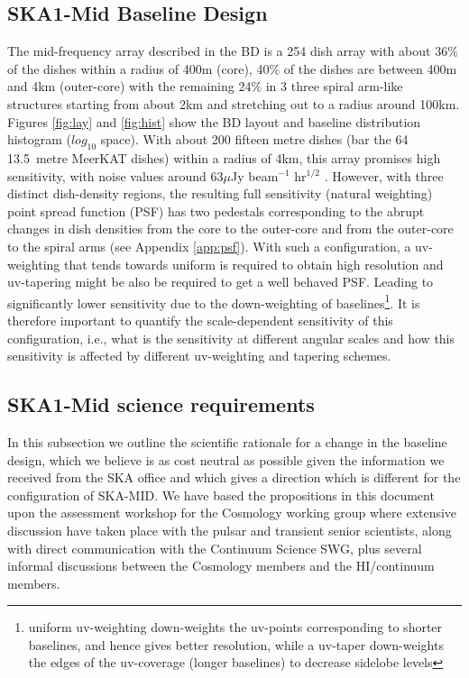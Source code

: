 \documentclass[sfheadings,a4paper,times,9pt,floats,floatfix]{article}
\begin{document}
\subsection{SKA1-Mid Baseline Design}\label{sec:BL}
The mid-frequency array described in the BD is a 254 dish array with about $36\%$ of the dishes within a radius of 400m (core),
40\% of the dishes are between 400m and 4km (outer-core) with the remaining 24\% in 3 three spiral arm-like structures starting
from about 2km and stretching out to a radius around 100km. Figures \ref{fig:lay} and \ref{fig:hist} show the BD layout and
baseline distribution histogram ($log_{10}$ space). With about 200 fifteen metre dishes (bar the 64 13.5~metre MeerKAT dishes)
within a radius of 4km, this array promises high sensitivity, with noise values around 63$\mu$Jy beam$^{-1}$ hr$^{1/2}$ \cite{bd}.
However, with three distinct dish-density regions, the resulting full sensitivity (natural weighting) point spread function (PSF)
has two pedestals
corresponding to the abrupt changes in dish densities from the core to the outer-core and from the outer-core to the spiral arms
(see Appendix \ref{app:psf}). With such a configuration, a uv-weighting that tends towards uniform is required to obtain high
resolution and uv-tapering might be also be required to get a well
behaved PSF. Leading to significantly lower sensitivity due to the
down-weighting of baselines\footnote{uniform uv-weighting down-weights the uv-points corresponding to shorter baselines, and hence
gives better resolution, while a uv-taper down-weights the edges of the uv-coverage (longer baselines) to decrease sidelobe
levels}. It is therefore important to quantify the scale-dependent sensitivity of this configuration, i.e., what is the
sensitivity at different angular scales and how this sensitivity is affected by different uv-weighting and tapering schemes. 

\subsection{SKA1-Mid science requirements}\label{sec:sci-req}

In this subsection we outline the scientific rationale for a change in
the baseline design,
which we believe is as cost neutral as possible given the information we received from the
SKA office and which gives a direction which is different for the configuration of SKA-MID.
We have based the propositions in this document upon the assessment workshop for the
Cosmology working group where extensive discussion have taken place with the pulsar and
transient senior scientists, along with direct communication with the
Continuum Science SWG, plus several informal discussions between the Cosmology
members and the HI/continuum members.
\end{document}
